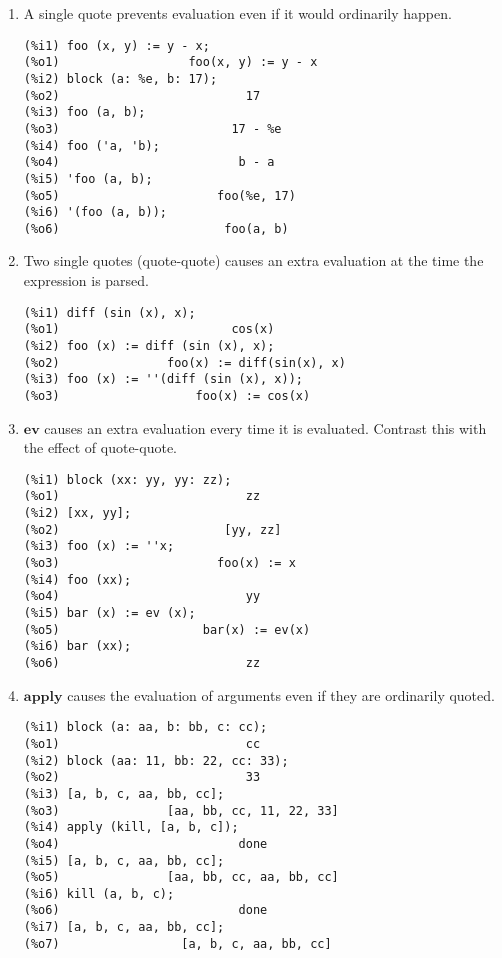 \documentclass[12pt]{article}
\begin{document}
\begin{enumerate}
\item A single quote prevents evaluation even if it would ordinarily happen.

\begin{verbatim}
(%i1) foo (x, y) := y - x;
(%o1)                  foo(x, y) := y - x
(%i2) block (a: %e, b: 17);
(%o2)                          17
(%i3) foo (a, b);
(%o3)                        17 - %e
(%i4) foo ('a, 'b);
(%o4)                         b - a
(%i5) 'foo (a, b);
(%o5)                      foo(%e, 17)
(%i6) '(foo (a, b));
(%o6)                       foo(a, b)
\end{verbatim}

\item Two single quotes (quote-quote) causes an extra evaluation at the time the expression is parsed.

\begin{verbatim}
(%i1) diff (sin (x), x);
(%o1)                        cos(x)
(%i2) foo (x) := diff (sin (x), x);
(%o2)               foo(x) := diff(sin(x), x)
(%i3) foo (x) := ''(diff (sin (x), x));
(%o3)                   foo(x) := cos(x)
\end{verbatim}

\item $\mathbf{ev}$ causes an extra evaluation every time it is evaluated.
Contrast this with the effect of quote-quote.

\begin{verbatim}
(%i1) block (xx: yy, yy: zz);
(%o1)                          zz
(%i2) [xx, yy];
(%o2)                       [yy, zz]
(%i3) foo (x) := ''x;
(%o3)                      foo(x) := x
(%i4) foo (xx);
(%o4)                          yy
(%i5) bar (x) := ev (x);
(%o5)                    bar(x) := ev(x)
(%i6) bar (xx);
(%o6)                          zz
\end{verbatim}

\item $\mathbf{apply}$ causes the evaluation of arguments even if they are ordinarily quoted.

\begin{verbatim}
(%i1) block (a: aa, b: bb, c: cc);
(%o1)                          cc
(%i2) block (aa: 11, bb: 22, cc: 33);
(%o2)                          33
(%i3) [a, b, c, aa, bb, cc];
(%o3)               [aa, bb, cc, 11, 22, 33]
(%i4) apply (kill, [a, b, c]);
(%o4)                         done
(%i5) [a, b, c, aa, bb, cc];
(%o5)               [aa, bb, cc, aa, bb, cc]
(%i6) kill (a, b, c);
(%o6)                         done
(%i7) [a, b, c, aa, bb, cc];
(%o7)                 [a, b, c, aa, bb, cc]
\end{verbatim}


\end{enumerate}
\end{document}

